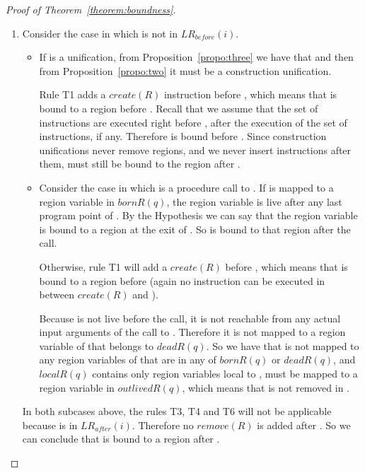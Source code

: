\documentclass{tlp}
\newcommand{\LRb}[1]{\ensuremath{\mathit{LR}_{before}(#1)}}
\newcommand{\LRa}[1]{\ensuremath{\mathit{LR}_{after}(#1)}}
\newcommand{\bornR}[1]{\ensuremath{{bornR}(#1)}}
\newcommand{\deadR}[1]{\ensuremath{{deadR}(#1)}}
\newcommand{\localR}[1]{\ensuremath{{localR}(#1)}}
\newcommand{\outlivedR}[1]{\ensuremath{{outlivedR}(#1)}}
\newcommand{\create}[1]{\ensuremath{{create}(#1)}}
\newcommand{\remove}[1]{\ensuremath{{remove}(#1)}}
\begin{document}
\begin{proof}[Proof of Theorem~\ref{theorem:boundness}]
\begin{description}
    \begin{enumerate}
    \item
        Consider the case in which  is not in \LRb{i}.

        \begin{itemize}
        \item
            If  is a unification,
            from Proposition~\ref{propo:three}
            we have that 
            and then from Proposition~\ref{propo:two}
            it must be a construction unification.

            Rule T1 adds a \create{R} instruction before ,
            which means that  is bound to a region before .
            Recall that we assume that
            the set of  instructions
            are executed right before ,
            after the execution of the set of  instructions, if any.
            Therefore  is bound before .
            Since construction unifications never remove regions,
            and we never insert  instructions after them,
             must still be bound to the region after .

        \item
            Consider the case in which
             is a procedure call to .
            If  is mapped to a region variable in \bornR{q},
            the region variable is live
            after any last program point of .
            By the Hypothesis we can say that
            the region variable is bound to a region
            at the exit of .
            So  is bound to that region after the call.

            Otherwise, rule T1 will add a \create{R} before ,
            which means that  is bound to a region before 
            (again no  instruction can be executed
            in between \create{R} and ).

            Because  is not live before the call,
            it is not reachable from any actual input arguments
            of the call to .
            Therefore it is not mapped to a region variable of 
            that belongs to \deadR{q}.
            So we have that  is not mapped to any region variables of 
            that are in any of \bornR{q} or \deadR{q},
            and \localR{q} contains only region variables local to ,
             must be mapped to a region variable in \outlivedR{q},
            which means that  is not removed in .
        \end{itemize}

        In both subcases above,
        the rules T3, T4 and T6 will not be applicable
        because  is in \LRa{i}.
        Therefore no \remove{R} is added after .
        So we can conclude that  is bound to a region after .


\end{enumerate}
\end{description}
\end{proof}
\end{document}
